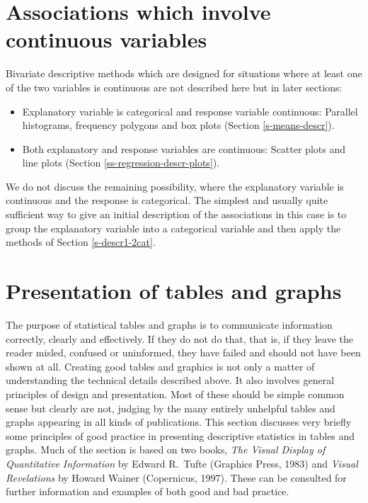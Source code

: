 \documentclass[11pt,a4paper,openany]{book}
\begin{document}
\section{Associations which involve continuous
variables}\label{s-descr1-2cont}

Bivariate descriptive methods which are designed for situations where at
least one of the two variables is continuous are not described here but
in later sections:

\begin{itemize}
\item
  Explanatory variable is categorical and response variable continuous:
  Parallel histograms, frequency polygons and box plots (Section
  \ref{s-means-descr}).
\item
  Both explanatory and response variables are continuous: Scatter plots
  and line plots (Section \ref{ss-regression-descr-plots}).
\end{itemize}

We do not discuss the remaining possibility, where the explanatory
variable is continuous and the response is categorical. The simplest and
usually quite sufficient way to give an initial description of the
associations in this case is to group the explanatory variable into a
categorical variable and then apply the methods of Section
\ref{s-descr1-2cat}.

\section{Presentation of tables and graphs}\label{s-descr1-presentation}

The purpose of statistical tables and graphs is to communicate
information correctly, clearly and effectively. If they do not do that,
that is, if they leave the reader misled, confused or uninformed, they
have failed and should not have been shown at all. Creating good tables
and graphics is not only a matter of understanding the technical details
described above. It also involves general principles of design and
presentation. Most of these should be simple common sense but clearly
are not, judging by the many entirely unhelpful tables and graphs
appearing in all kinds of publications. This section discusses very
briefly some principles of good practice in presenting descriptive
statistics in tables and graphs. Much of the section is based on two
books, \emph{The Visual Display of Quantitative Information} by Edward
R.~Tufte (Graphics Press, 1983) and \emph{Visual Revelations} by Howard
Wainer (Copernicus, 1997). These can be consulted for further
information and examples of both good and bad practice.
\end{document}
